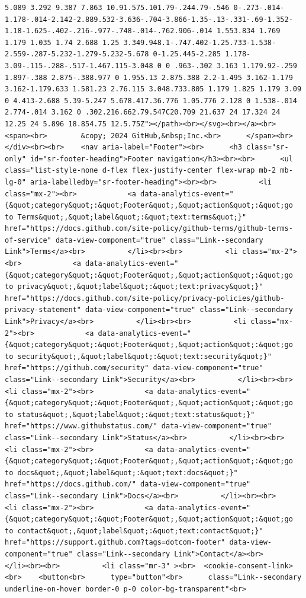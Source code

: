 \documentclass[
  letterpaper,
]{book}
\begin{document}
\begin{verbatim}
5.089 3.292 9.387 7.863 10.91.575.101.79-.244.79-.546 0-.273-.014-1.178-.014-2.142-2.889.532-3.636-.704-3.866-1.35-.13-.331-.69-1.352-1.18-1.625-.402-.216-.977-.748-.014-.762.906-.014 1.553.834 1.769 1.179 1.035 1.74 2.688 1.25 3.349.948.1-.747.402-1.25.733-1.538-2.559-.287-5.232-1.279-5.232-5.678 0-1.25.445-2.285 1.178-3.09-.115-.288-.517-1.467.115-3.048 0 0 .963-.302 3.163 1.179.92-.259 1.897-.388 2.875-.388.977 0 1.955.13 2.875.388 2.2-1.495 3.162-1.179 3.162-1.179.633 1.581.23 2.76.115 3.048.733.805 1.179 1.825 1.179 3.09 0 4.413-2.688 5.39-5.247 5.678.417.36.776 1.05.776 2.128 0 1.538-.014 2.774-.014 3.162 0 .302.216.662.79.547C20.709 21.637 24 17.324 24 12.25 24 5.896 18.854.75 12.5.75Z"></path><br></svg><br></a><br>      <span><br>        &copy; 2024 GitHub,&nbsp;Inc.<br>      </span><br>    </div><br><br>    <nav aria-label="Footer"><br>      <h3 class="sr-only" id="sr-footer-heading">Footer navigation</h3><br><br>      <ul class="list-style-none d-flex flex-justify-center flex-wrap mb-2 mb-lg-0" aria-labelledby="sr-footer-heading"><br><br>          <li class="mx-2"><br>            <a data-analytics-event="{&quot;category&quot;:&quot;Footer&quot;,&quot;action&quot;:&quot;go to Terms&quot;,&quot;label&quot;:&quot;text:terms&quot;}" href="https://docs.github.com/site-policy/github-terms/github-terms-of-service" data-view-component="true" class="Link--secondary Link">Terms</a><br>          </li><br><br>          <li class="mx-2"><br>            <a data-analytics-event="{&quot;category&quot;:&quot;Footer&quot;,&quot;action&quot;:&quot;go to privacy&quot;,&quot;label&quot;:&quot;text:privacy&quot;}" href="https://docs.github.com/site-policy/privacy-policies/github-privacy-statement" data-view-component="true" class="Link--secondary Link">Privacy</a><br>          </li><br><br>          <li class="mx-2"><br>            <a data-analytics-event="{&quot;category&quot;:&quot;Footer&quot;,&quot;action&quot;:&quot;go to security&quot;,&quot;label&quot;:&quot;text:security&quot;}" href="https://github.com/security" data-view-component="true" class="Link--secondary Link">Security</a><br>          </li><br><br>          <li class="mx-2"><br>            <a data-analytics-event="{&quot;category&quot;:&quot;Footer&quot;,&quot;action&quot;:&quot;go to status&quot;,&quot;label&quot;:&quot;text:status&quot;}" href="https://www.githubstatus.com/" data-view-component="true" class="Link--secondary Link">Status</a><br>          </li><br><br>          <li class="mx-2"><br>            <a data-analytics-event="{&quot;category&quot;:&quot;Footer&quot;,&quot;action&quot;:&quot;go to docs&quot;,&quot;label&quot;:&quot;text:docs&quot;}" href="https://docs.github.com/" data-view-component="true" class="Link--secondary Link">Docs</a><br>          </li><br><br>          <li class="mx-2"><br>            <a data-analytics-event="{&quot;category&quot;:&quot;Footer&quot;,&quot;action&quot;:&quot;go to contact&quot;,&quot;label&quot;:&quot;text:contact&quot;}" href="https://support.github.com?tags=dotcom-footer" data-view-component="true" class="Link--secondary Link">Contact</a><br>          </li><br><br>          <li class="mr-3" ><br>  <cookie-consent-link><br>    <button<br>      type="button"<br>      class="Link--secondary underline-on-hover border-0 p-0 color-bg-transparent"<br>      
\end{verbatim}
\end{document}
